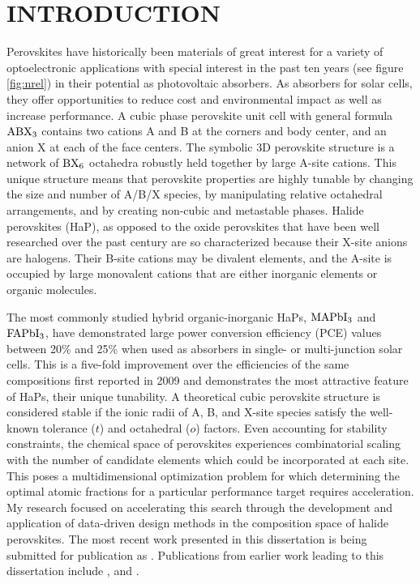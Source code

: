\chapter{INTRODUCTION}
\label{sec:org8700206}

Perovskites have historically been materials of great interest for a variety of optoelectronic applications with special interest in the past ten years (see figure \ref{fig:nrel}) in their potential as photovoltaic absorbers.
As absorbers for solar cells, they offer opportunities to reduce cost and environmental impact as well as increase performance.
\autocite{ansari-2018-front-oppor,yin-2015-halid-perov,manser-2016-intrig-optoel,brenner-2016-hybrid-organ}
A cubic phase perovskite unit cell with general formula \(\ce{ABX3}\) contains two cations A and B at the corners and body center, and an anion X at each of the face centers.
The symbolic 3D perovskite structure is a network of \(\ce{BX6}\) octahedra robustly held together by large A-site cations.
This unique structure means that perovskite properties are highly tunable by changing the size and number of A/B/X species, by manipulating relative octahedral arrangements, and by creating non-cubic and metastable phases.
Halide perovskites (HaP), as opposed to the oxide perovskites that have been well researched over the past century are so characterized because their X-site anions are halogens.
Their B-site cations may be divalent elements, and the A-site is occupied by large monovalent cations that are either inorganic elements or organic molecules.

The most commonly studied hybrid organic-inorganic HaPs, \(\ce{MAPbI3}\) and \(\ce{FAPbI3}\), have demonstrated large power conversion efficiency (PCE) values between 20\% and 25\% when used as absorbers in single- or multi-junction solar cells.
\autocite{cui-2019-planar-p,jeong-2020-stabl-perov}
This is a five-fold improvement over the efficiencies of the same compositions first reported in 2009 and demonstrates the most attractive feature of HaPs, their unique tunability.
A theoretical cubic perovskite structure is considered stable if the ionic radii of A, B, and X-site species satisfy the well-known tolerance (\(t\)) and octahedral (\(o\)) factors.
\autocite{bartel-2019-new-toler}
Even accounting for stability constraints, the chemical space of perovskites experiences combinatorial scaling with the number of candidate elements which could be incorporated at each site.
This poses a multidimensional optimization problem for which determining the optimal atomic fractions for a particular performance target requires acceleration.
My research focused on accelerating this search through the development and application of data-driven design methods in the composition space of halide perovskites.
The most recent work presented in this dissertation is being submitted for publication as . 
Publications from earlier work leading to this dissertation include
,
and .

